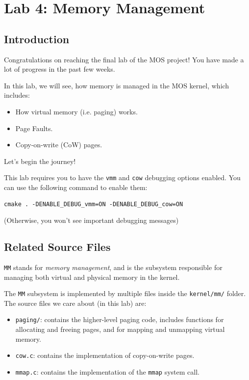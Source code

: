 \chapter{Lab 4: Memory Management}

\section{Introduction}

Congratulations on reaching the final lab of the MOS project! You have
made a lot of progress in the past few weeks.

In this lab, we will see, how memory is managed in the MOS kernel, which includes:

\begin{itemize}
    \item How virtual memory (i.e. paging) works.
    \item Page Faults.
    \item Copy-on-write (CoW) pages.
\end{itemize}

Let's begin the journey!

\begin{note}
    \item This lab requires you to have the \texttt{vmm} and \texttt{cow} debugging options
    enabled. You can use the following command to enable them:
    \begin{verbatim}
cmake . -DENABLE_DEBUG_vmm=ON -DENABLE_DEBUG_cow=ON
    \end{verbatim}
    \item (Otherwise, you won't see important debugging messages)
\end{note}

\section{Related Source Files}

\texttt{MM} stands for \textit{memory management}, and is the subsystem
responsible for managing both virtual and physical memory in the kernel.

The \texttt{MM} subsystem is implemented by multiple files inside the \texttt{kernel/mm/}
folder. The source files we care about (in this lab) are:

\begin{itemize}
    \item \texttt{paging/}: contains the higher-level paging code, includes functions
          for allocating and freeing pages, and for mapping and unmapping virtual
          memory.
    \item \texttt{cow.c}: contains the implementation of copy-on-write pages.
    \item \texttt{mmap.c}: contains the implementation of the \texttt{mmap} system call.
\end{itemize}

